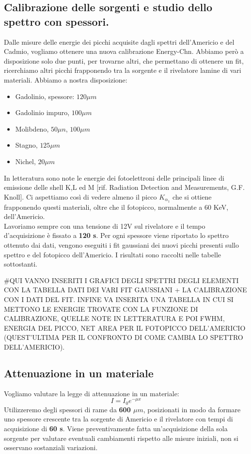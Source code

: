 \documentclass[a4paper]{article}
\begin{document}
\subsection{Calibrazione delle sorgenti e studio dello spettro con spessori.}

Dalle misure delle energie dei picchi acquisite dagli spettri dell'Americio e del Cadmio, vogliamo ottenere una nuova calibrazione Energy-Chn. Abbiamo però a disposizione solo due punti, per trovarne altri, che permettano di ottenere un fit, ricerchiamo altri picchi frapponendo tra la sorgente e il rivelatore lamine di vari materiali. Abbiamo a nostra disposizione:
\begin{itemize}
\item Gadolinio, spessore: $120 \mu m$
\item Gadolinio impuro, $100 \mu m$
\item Molibdeno, $50 \mu n$, $100 \mu m$
\item Stagno, $125 \mu m$
\item Nichel, $20 \mu m$
\end{itemize}




In letteratura sono note le energie dei fotoelettroni delle principali linee di emissione delle shell K,L ed M [rif. Radiation Detection and Measurements, G.F. Knoll].
 Ci aspettiamo così di vedere almeno il picco \textbf{$K_{\alpha_{1}}$} che si ottiene frapponendo questi materiali, oltre che il fotopicco, normalmente a 60 KeV, dell'Americio. \\
Lavoriamo sempre con una tensione di 12V sul rivelatore e il tempo d'acquisizione è fissato a \textbf{120 s}. Per ogni spessore viene riportato lo spettro ottenuto dai dati, vengono eseguiti i fit gaussiani dei nuovi picchi presenti sullo spettro e del fotopicco dell'Americio. I risultati sono raccolti nelle tabelle sottostanti.

$\#$QUI VANNO INSERITI I GRAFICI DEGLI SPETTRI DEGLI ELEMENTI CON LA TABELLA DATI DEI VARI FIT GAUSSIANI + LA CALIBRAZIONE CON I DATI DEL FIT. INFINE VA INSERITA UNA TABELLA IN CUI SI METTONO LE ENERGIE TROVATE CON LA FUNZIONE DI CALIBRAZIONE, QUELLE NOTE IN LETTERATURA E POI FWHM, ENERGIA DEL PICCO, NET AREA PER IL FOTOPICCO DELL'AMERICIO (QUEST'ULTIMA PER IL CONFRONTO DI COME CAMBIA LO SPETTRO DELL'AMERICIO).
\subsection{Attenuazione in un materiale}
Vogliamo valutare la legge di attenuazione in un materiale:
\begin{equation}
I=I_{0}e^{-\mu x}
\end{equation}
Utilizzeremo degli spessori di rame da \textbf{600 $\mu m$}, posizionati in modo da formare uno spessore crescente tra la sorgente di Americio e il rivelatore con tempi di acquisizione di \textbf{60 s}. Viene preventivamente fatta un'acquisizione della sola sorgente per valutare eventuali cambiamenti rispetto alle misure iniziali, non si osservano sostanziali variazioni.\\
\end{document}
